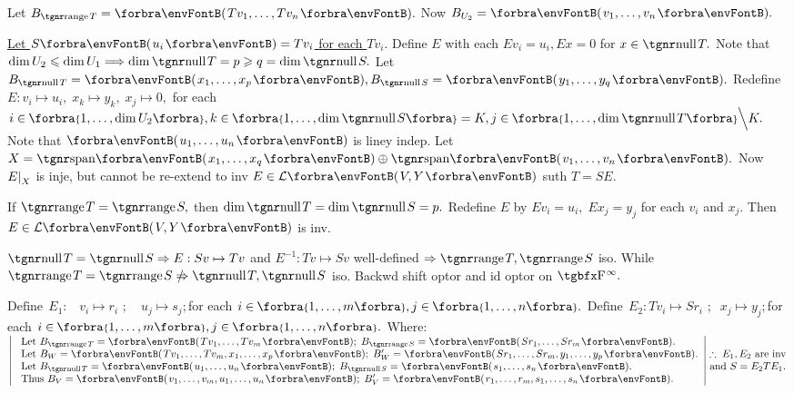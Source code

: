  \;Let $B_{\range T}=\Par{Tv_1,\dots,Tv_n}.$ Now $B_{U_2}=\Par{v_1,\dots,v_n}.$\par\quad
\uline{Let $S\Par{u_i}=Tv_i$ for each $Tv_i.$} \;Define $E$ with each $Ev_i=u_i,Ex=0$ for $x\in\null T.$\PfEnd\vspace{4pt}\quad
\AComm {} \;Note that $\dim U_2\leqslant\dim U_1\Longrightarrow\dim\null T=p\geqslant q=\dim\null S.$\parCom\quad
Let $B_{\null T}=\Par{x_1,\dots,x_p},B_{\null S}=\Par{y_1,\dots,y_q}.$ Redefine $E:v_i\mapsto u_i,\;x_k\mapsto y_k,\;x_j\mapsto 0,$\parCom\quad
for each $i\in\;\!\!\Bra{1,\dots,\dim U_2},k\in\;\!\!\Bra{1,\dots,\dim\null S}=K,j\in\;\!\!\Bra{1,\dots,\dim\null T}\Backslash[\Big]K.$\parCom\quad
Note that $\Par{u_1,\dots,u_n}$ is liney indep. Let $X=\Span{x_1,\dots,x_q}\oplus\Span{v_1,\dots,v_n}.$\parCom\quad
Now $E\text{\normalsize|}_X$ is inje, but cannot be re-extend to inv $E\in\Lm{V,Y}$ suth $T=SE.$\par{}\vspace{4pt}\quad
\ACoro {} \;If $\range T=\range S,$ then $\dim\null T=\dim\null S=p.$\parCor\quad
Redefine $E$ by $Ev_i=u_i,\;Ex_j=y_j$ for each $v_i$ and $x_j.$ Then $E\in\Lm{V,Y}$ is inv.\PfEnd
\SepLine

\BulletPointX\ANote $\null T=\null S\Rightarrow E:Sv\mapsto Tv$ and $E^{-1}:Tv\mapsto Sv$ well-defined $\Rightarrow\range T,\range S$ iso.\parNot{\IndentB}
While $\range T=\range S\notRightarrow\null T,\null S$ iso. \;\AExa Backwd shift optor and id optor on $\FbbP{\infty}.$
\SepLine

$\text{Define}\;\,E_1:\,\,\,\,\, v_i\mapsto r_i\,\,;\quad u_j\mapsto s_j;$\quad for each $i\in\;\!\!\Bra{1,\dots,m},j\in\;\!\!\Bra{1,\dots,n}.$\parSol{}
$\text{Define}\;\,E_2:Tv_i\mapsto Sr_i\,\,;\;\;x_j\mapsto y_j;$\quad for each $i\in\;\!\!\Bra{1,\dots,m},j\in\;\!\!\Bra{1,\dots,n}.$
Where:\parSol{\vspace{2pt}}
$\MathLeftrightMid{l}{$
	Let $B_{\range T}=\Par{Tv_1,\dots,Tv_m};\;B_{\range S}=\Par{Sr_1,\dots,Sr_m}.\\ $
	Let $B_W=\Par{Tv_1,\dots,Tv_m,x_1,\dots,x_p};\;B_W'=\Par{Sr_1,\dots,Sr_m,y_1,\dots,y_p}.\\ $
	Let $B_{\null T}=\Par{u_1,\dots,u_n};\;B_{\null S}=\Par{s_1,\dots,s_n}.\\ $
	Thus $B_V=\Par{v_1,\dots,v_m,u_1,\dots,u_n};\;B_V'=\Par{r_1,\dots,r_m,s_1,\dots,s_n}.}\hMath{c}{}{}{\therefore\;E_1,E_2$ are inv$ \\ $and $S=E_2 TE_1.}$\PfEnd
\SepLine

